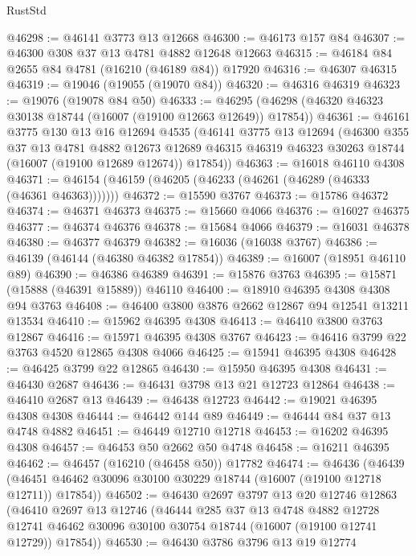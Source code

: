 \begin{lexlean}{RustStd}
\begin{coremodule}
@46298 := @46141 @3773 @13 @12668
@46300 := @46173 @157 @84
@46307 := @46300 @308 @37 @13 @4781 @4882 @12648 @12663
@46315 := @46184 @84 @2655 @84 @4781 (@16210 (@46189 @84)) @17920
@46316 := @46307 @46315
@46319 := @19046 (@19055 (@19070 @84))
@46320 := @46316 @46319
@46323 := @19076 (@19078 @84 @50)
@46333 := @46295 (@46298 (@46320 @46323 @30138 @18744 (@16007 (@19100 @12663 @12649)) @17854))
@46361 := @46161
    @3775
    @130
    @13
    @16
    @12694
    @4535
    (@46141
      @3775
      @13
      @12694
      (@46300
        @355
        @37
        @13
        @4781
        @4882
        @12673
        @12689
        @46315
        @46319
        @46323
        @30263
        @18744
        (@16007 (@19100 @12689 @12674))
        @17854))
@46363 := @16018 @46110 @4308
@46371 := @46154 (@46159 (@46205 (@46233 (@46261 (@46289 (@46333 (@46361 @46363)))))))
@46372 := @15590 @3767
@46373 := @15786 @46372
@46374 := @46371 @46373
@46375 := @15660 @4066
@46376 := @16027 @46375
@46377 := @46374 @46376
@46378 := @15684 @4066
@46379 := @16031 @46378
@46380 := @46377 @46379
@46382 := @16036 (@16038 @3767)
@46386 := @46139 (@46144 (@46380 @46382 @17854))
@46389 := @16007 (@18951 @46110 @89)
@46390 := @46386 @46389
@46391 := @15876 @3763
@46395 := @15871 (@15888 (@46391 @15889)) @46110
@46400 := @18910 @46395 @4308 @4308 @94 @3763
@46408 := @46400 @3800 @3876 @2662 @12867 @94 @12541 @13211 @13534
@46410 := @15962 @46395 @4308
@46413 := @46410 @3800 @3763 @12867
@46416 := @15971 @46395 @4308 @3767
@46423 := @46416 @3799 @22 @3763 @4520 @12865 @4308 @4066
@46425 := @15941 @46395 @4308
@46428 := @46425 @3799 @22 @12865
@46430 := @15950 @46395 @4308
@46431 := @46430 @2687
@46436 := @46431 @3798 @13 @21 @12723 @12864
@46438 := @46410 @2687 @13
@46439 := @46438 @12723
@46442 := @19021 @46395 @4308 @4308
@46444 := @46442 @144 @89
@46449 := @46444 @84 @37 @13 @4748 @4882
@46451 := @46449 @12710 @12718
@46453 := @16202 @46395 @4308
@46457 := @46453 @50 @2662 @50 @4748
@46458 := @16211 @46395
@46462 := @46457 (@16210 (@46458 @50)) @17782
@46474 := @46436
    (@46439 (@46451 @46462 @30096 @30100 @30229 @18744 (@16007 (@19100 @12718 @12711)) @17854))
@46502 := @46430
    @2697
    @3797
    @13
    @20
    @12746
    @12863
    (@46410
      @2697
      @13
      @12746
      (@46444
        @285
        @37
        @13
        @4748
        @4882
        @12728
        @12741
        @46462
        @30096
        @30100
        @30754
        @18744
        (@16007 (@19100 @12741 @12729))
        @17854))
@46530 := @46430
    @3786
    @3796
    @13
    @19
    @12774

\end{coremodule}
\end{lexlean}
